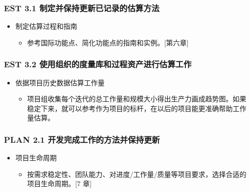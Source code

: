 \hypertarget{est-3.1-ux5236ux5b9aux5e76ux4fddux6301ux66f4ux65b0ux5df2ux8bb0ux5f55ux7684ux4f30ux7b97ux65b9ux6cd5}{%
\subsubsection{EST 3.1
制定并保持更新已记录的估算方法}\label{est-3.1-ux5236ux5b9aux5e76ux4fddux6301ux66f4ux65b0ux5df2ux8bb0ux5f55ux7684ux4f30ux7b97ux65b9ux6cd5}}

\begin{itemize}
\tightlist
\item
  制定估算过程和指南

  \begin{itemize}
  \tightlist
  \item
    参考国际功能点、简化功能点的指南和实例。{[}第六章{]}
  \end{itemize}
\end{itemize}

\hypertarget{est-3.2-ux4f7fux7528ux7ec4ux7ec7ux7684ux5ea6ux91cfux5e93ux548cux8fc7ux7a0bux8d44ux4ea7ux8fdbux884cux4f30ux7b97ux5de5ux4f5c}{%
\subsubsection{EST 3.2
使用组织的度量库和过程资产进行估算工作}\label{est-3.2-ux4f7fux7528ux7ec4ux7ec7ux7684ux5ea6ux91cfux5e93ux548cux8fc7ux7a0bux8d44ux4ea7ux8fdbux884cux4f30ux7b97ux5de5ux4f5c}}

\begin{itemize}
\tightlist
\item
  依据项目历史数据估算工作量

  \begin{itemize}
  \tightlist
  \item
    项目组收集每个迭代的总工作量和规模大小得出生产力画成趋势图。如果稳定下来，就可以参考作为项目的标杆，在以后的项目能更准确帮助工作量估算。
  \end{itemize}
\end{itemize}

\hypertarget{plan-2.1-ux5f00ux53d1ux5b8cux6210ux5de5ux4f5cux7684ux65b9ux6cd5ux5e76ux4fddux6301ux66f4ux65b0}{%
\subsubsection{PLAN 2.1
开发完成工作的方法并保持更新}\label{plan-2.1-ux5f00ux53d1ux5b8cux6210ux5de5ux4f5cux7684ux65b9ux6cd5ux5e76ux4fddux6301ux66f4ux65b0}}

\begin{itemize}
\tightlist
\item
  项目生命周期

  \begin{itemize}
  \tightlist
  \item
    按需求稳定性、团队能力、对进度/工作量/质量等项目要求，选择合适的项目生命周期。{[}7
    章{]}
  \end{itemize}
\end{itemize}

